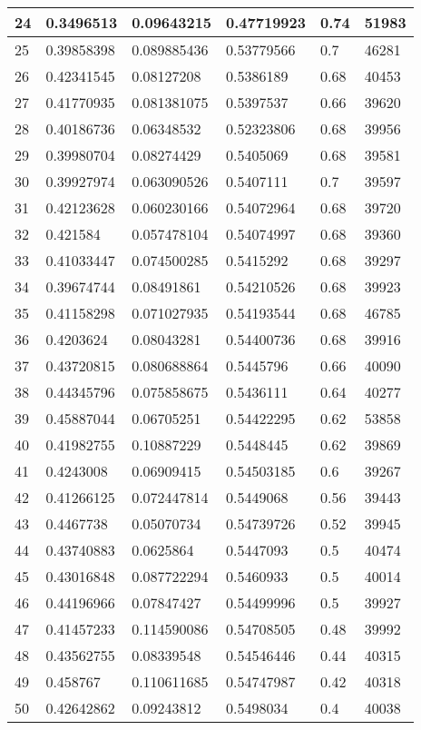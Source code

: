 \begin{longtable}{|l|l|l|l|l|l|}
24 & 0.3496513 & 0.09643215 & 0.47719923 & 0.74 & 51983 \\ \hline 
25 & 0.39858398 & 0.089885436 & 0.53779566 & 0.7 & 46281 \\ \hline 
26 & 0.42341545 & 0.08127208 & 0.5386189 & 0.68 & 40453 \\ \hline 
27 & 0.41770935 & 0.081381075 & 0.5397537 & 0.66 & 39620 \\ \hline 
28 & 0.40186736 & 0.06348532 & 0.52323806 & 0.68 & 39956 \\ \hline 
29 & 0.39980704 & 0.08274429 & 0.5405069 & 0.68 & 39581 \\ \hline 
30 & 0.39927974 & 0.063090526 & 0.5407111 & 0.7 & 39597 \\ \hline 
31 & 0.42123628 & 0.060230166 & 0.54072964 & 0.68 & 39720 \\ \hline 
32 & 0.421584 & 0.057478104 & 0.54074997 & 0.68 & 39360 \\ \hline 
33 & 0.41033447 & 0.074500285 & 0.5415292 & 0.68 & 39297 \\ \hline 
34 & 0.39674744 & 0.08491861 & 0.54210526 & 0.68 & 39923 \\ \hline 
35 & 0.41158298 & 0.071027935 & 0.54193544 & 0.68 & 46785 \\ \hline 
36 & 0.4203624 & 0.08043281 & 0.54400736 & 0.68 & 39916 \\ \hline 
37 & 0.43720815 & 0.080688864 & 0.5445796 & 0.66 & 40090 \\ \hline 
38 & 0.44345796 & 0.075858675 & 0.5436111 & 0.64 & 40277 \\ \hline 
39 & 0.45887044 & 0.06705251 & 0.54422295 & 0.62 & 53858 \\ \hline 
40 & 0.41982755 & 0.10887229 & 0.5448445 & 0.62 & 39869 \\ \hline 
41 & 0.4243008 & 0.06909415 & 0.54503185 & 0.6 & 39267 \\ \hline 
42 & 0.41266125 & 0.072447814 & 0.5449068 & 0.56 & 39443 \\ \hline 
43 & 0.4467738 & 0.05070734 & 0.54739726 & 0.52 & 39945 \\ \hline 
44 & 0.43740883 & 0.0625864 & 0.5447093 & 0.5 & 40474 \\ \hline 
45 & 0.43016848 & 0.087722294 & 0.5460933 & 0.5 & 40014 \\ \hline 
46 & 0.44196966 & 0.07847427 & 0.54499996 & 0.5 & 39927 \\ \hline 
47 & 0.41457233 & 0.114590086 & 0.54708505 & 0.48 & 39992 \\ \hline 
48 & 0.43562755 & 0.08339548 & 0.54546446 & 0.44 & 40315 \\ \hline 
49 & 0.458767 & 0.110611685 & 0.54747987 & 0.42 & 40318 \\ \hline 
50 & 0.42642862 & 0.09243812 & 0.5498034 & 0.4 & 40038 \\ \hline 
\end{longtable}